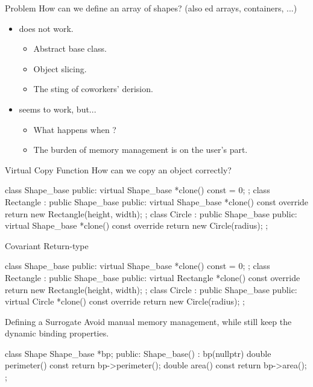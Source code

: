 \documentclass{beamer}
\begin{document}
\begin{frame}{Problem}
    How can we define an array of shapes? (also ed arrays, containers, ...)
    \begin{itemize}
        \item {} does not work.
        \begin{itemize}
            \item Abstract base class.
            \item Object slicing.
            \item The sting of coworkers' derision.
        \end{itemize}
        \item {} seems to work, but...
        \begin{itemize}
            \item What happens when ?
            \item The burden of memory management is on the user's part.
        \end{itemize}
    \end{itemize}
\end{frame}

\begin{frame}[fragile]{Virtual Copy Function}
    How can we copy an object correctly?
    \pause
    \begin{cpp}
class Shape_base {
 public:
  virtual Shape_base *clone() const = 0;
};
class Rectangle : public Shape_base {
 public:
  virtual Shape_base *clone() const override
    { return new Rectangle(height, width); }
};
class Circle : public Shape_base {
 public:
  virtual Shape_base *clone() const override
    { return new Circle(radius); }
};
    \end{cpp}
\end{frame}

\begin{frame}[fragile]{Covariant Return-type}
    \begin{cpp}
class Shape_base {
 public:
  virtual Shape_base *clone() const = 0;
};
class Rectangle : public Shape_base {
 public:
  virtual Rectangle *clone() const override
    { return new Rectangle(height, width); }
};
class Circle : public Shape_base {
 public:
  virtual Circle *clone() const override
    { return new Circle(radius); }
};
    \end{cpp}
\end{frame}

\begin{frame}[fragile]{Defining a Surrogate}
    Avoid manual memory management, while still keep the dynamic binding properties.
    \begin{cpp}
class Shape {
  Shape_base *bp;
 public:
  Shape_base() : bp(nullptr) {}
  double perimeter() const {
    return bp->perimeter();
  }
  double area() const {
      return bp->area();
  }
};
    \end{cpp}
\end{frame}
\end{document}
